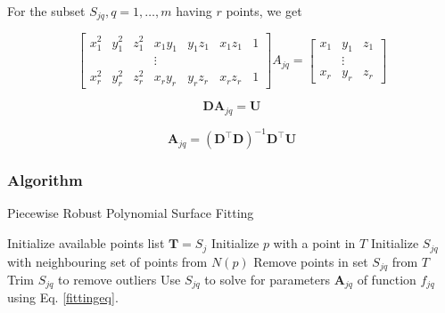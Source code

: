 \documentclass[12pt,a4paper]{article}
\begin{document}
    \noindent For the subset  $S_{jq}, q=1,\dots,m$ having $r$ points, we get
    
    \begin{equation}
    \left[\begin{array}{ccccccc}{x_{1}^{2}}&{y_{1}^{2}}&{z_{1}^{2}}&{x_{1}y_{1}}&{y_{1}z_{1}}&{x_{1}z_{1}}&{1}\\{}&{}&{}&{\vdots}&{}&{}&{}\\{x_{r}^{2}}&{y_{r}^{2}}&{z_{r}^{2}}&{x_{r}y_{r}}&{y_{r}z_{r}}&{x_{r}z_{r}}&{1}\end{array}\right]A_{jq}=\left[\begin{array}{ccc}{x_{1}}&{y_{1}}&{z_{1}}\\{}&{\vdots}&{}\\{x_{r}}&{y_{r}}&{z_{r}}\end{array}\right]
    \end{equation}
    
    \begin{equation}
    \textbf{D} \textbf{A}_{jq}=\textbf{U}
    \end{equation}
    
    \begin{equation}\label{fittingeq}
    \textbf{A}_{jq}=\left(\textbf{D}^\top \textbf{D}\right)^{-1}\textbf{D}^\top \textbf{U}
    \end{equation}
    
    \subsubsection{Algorithm}
    \begin{algorithm}[H]
        \caption{Piecewise Robust Polynomial Surface Fitting}
        \begin{algorithmic}
            \State Initialize available points list $\textbf{T} = S_j$
            \Repeat
            \State Initialize $p$ with a point in $T$
            \State Initialize $S_{jq}$ with neighbouring set of points from $N(p)$
            \State Remove points in set $S_{jq}$ from $T$
            \State Trim $S_{jq}$ to remove outliers
            \State Use $S_{jq}$ to solve for parameters $\textbf{A}_{jq}$ of function $f_{jq}$ using Eq. \ref{fittingeq}.
            \EndFor
        \end{algorithmic}
    \end{algorithm}
    
    
    
\end{document}
